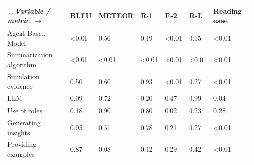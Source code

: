 \begin{tabular}{|l|l|l|l|l|l|l|}
\hline
\textit{$\downarrow$Variable / metric $\rightarrow$} & BLEU & METEOR & R-1 & R-2 & R-L & Reading ease \\
 \hline
 Agent-Based Model & \textless{}0.01 & 0.56 & 0.19 & \textless{}0.01 & 0.15 & \textless{}0.01 \\
 \hline
 Summarization algorithm & \textless{}0.01 & \textless{}0.01 & \textless{}0.01 & \textless{}0.01 & \textless{}0.01 & \textless{}0.01 \\
 \hline
 Simulation evidence & 0.50 & 0.60 & 0.93 & \textless{}0.01 & 0.27 & \textless{}0.01 \\
 \hline
 LLM & 0.09 & 0.72 & 0.20 & 0.47 & 0.99 & 0.04 \\
 \hline
 Use of roles & 0.18 & 0.90 & 0.80 & 0.02 & 0.23 & 0.28 \\
 \hline
 Generating insights & 0.95 & 0.51 & 0.78 & 0.21 & 0.27 & \textless{}0.01 \\
 \hline
 Providing examples & 0.87 & 0.08 & 0.12 & 0.29 & 0.42 & \textless{}0.01 \\
\hline
\end{tabular}
